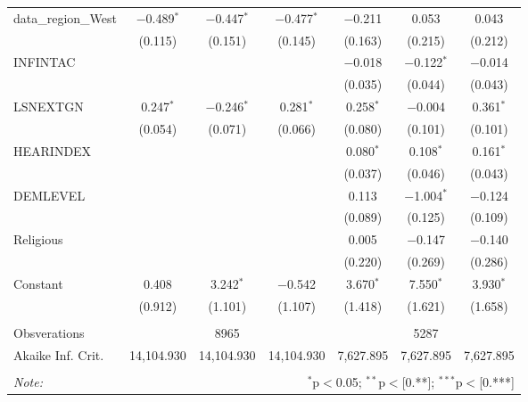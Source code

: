 \begin{table}[!htbp]
\begin{tabular}{@{\extracolsep{1pt}}lcccccc}
  data\_region\_West & $-$0.489$^{*}$ & $-$0.447$^{*}$ & $-$0.477$^{*}$ & $-$0.211 & 0.053 & 0.043 \\ 
  & (0.115) & (0.151) & (0.145) & (0.163) & (0.215) & (0.212) \\ 
  INFINTAC &  &  &  & $-$0.018 & $-$0.122$^{*}$ & $-$0.014 \\ 
  &  &  &  & (0.035) & (0.044) & (0.043) \\ 
  LSNEXTGN & 0.247$^{*}$ & $-$0.246$^{*}$ & 0.281$^{*}$ & 0.258$^{*}$ & $-$0.004 & 0.361$^{*}$ \\ 
  & (0.054) & (0.071) & (0.066) & (0.080) & (0.101) & (0.101) \\ 
  HEARINDEX &  &  &  & 0.080$^{*}$ & 0.108$^{*}$ & 0.161$^{*}$ \\ 
  &  &  &  & (0.037) & (0.046) & (0.043) \\ 
  DEMLEVEL &  &  &  & 0.113 & $-$1.004$^{*}$ & $-$0.124 \\ 
  &  &  &  & (0.089) & (0.125) & (0.109) \\ 
  Religious &  &  &  & 0.005 & $-$0.147 & $-$0.140 \\ 
  &  &  &  & (0.220) & (0.269) & (0.286) \\ 
  Constant & 0.408 & 3.242$^{*}$ & $-$0.542 & 3.670$^{*}$ & 7.550$^{*}$ & 3.930$^{*}$ \\ 
  & (0.912) & (1.101) & (1.107) & (1.418) & (1.621) & (1.658) \\ 
 \hline \\[-1.8ex] 
Obsverations &  & 8965 &  &  & 5287 &  \\ 
Akaike Inf. Crit. & 14,104.930 & 14,104.930 & 14,104.930 & 7,627.895 & 7,627.895 & 7,627.895 \\ 
\hline 
\hline \\[-1.8ex] 
\textit{Note:}  & \multicolumn{6}{r}{$^{*}$p$<$0.05; $^{**}$p$<$[0.**]; $^{***}$p$<$[0.***]} \\ 
\end{tabular} 
\end{table} 
